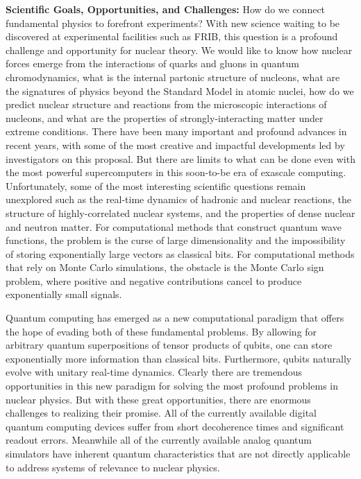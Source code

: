 \documentclass[10pt]{article}
\begin{document}
{\bf Scientific Goals, Opportunities, and Challenges:} 
How do we connect fundamental physics to forefront experiments?  With new science 
waiting to be discovered at experimental facilities such as FRIB, this question is a 
profound challenge and opportunity for nuclear theory.  We would like to know how nuclear forces emerge from the interactions of quarks and gluons in quantum chromodynamics, what is the internal partonic structure of nucleons, what are the signatures of physics beyond the Standard Model in atomic nuclei, how do we predict nuclear structure and reactions from the microscopic interactions of nucleons, and what are the properties of strongly-interacting matter under extreme conditions.  There have been many important and profound advances in recent years, with some of the most creative and impactful developments led by investigators on this proposal.  But there are limits to what can be done even with the most powerful supercomputers in this soon-to-be era of exascale computing.  Unfortunately, some of the most interesting scientific questions remain unexplored such as the real-time dynamics of hadronic and nuclear reactions, the structure of highly-correlated nuclear systems, and the properties of dense nuclear and neutron matter. For computational methods that construct quantum wave functions, the problem is the curse of large dimensionality and the impossibility of storing exponentially large vectors as classical bits.  For computational methods that rely on Monte Carlo simulations, the obstacle is the Monte Carlo sign problem, where positive and negative contributions cancel to produce exponentially small signals.

Quantum computing has emerged as a new computational paradigm that offers the hope of evading both of these fundamental problems.  By allowing for arbitrary quantum superpositions of tensor products of qubits, one can store exponentially more information than classical bits.  Furthermore, qubits naturally evolve with unitary real-time dynamics. Clearly there are tremendous opportunities in this new paradigm for solving the most profound problems in nuclear physics.  But with these great opportunities, there are enormous challenges to realizing their promise.  All of the currently available digital quantum computing devices suffer from short decoherence times and significant readout errors.  Meanwhile all of the currently available analog quantum simulators have inherent quantum characteristics that are not directly applicable to address systems of relevance to nuclear physics.
\end{document}
